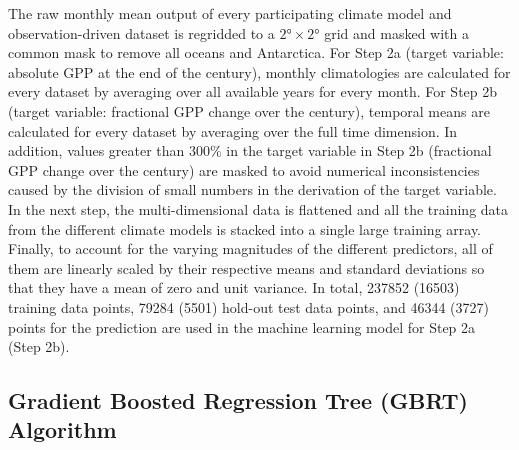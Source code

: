 The raw monthly mean output of every participating climate model and
observation-driven dataset is regridded to a $\ang{2} \times \ang{2}$ grid and
masked with a common mask to remove all oceans and Antarctica. For Step 2a
(target variable: absolute \acf{GPP} at the end of the  century),
monthly climatologies are calculated for every dataset by averaging over all
available years for every month. For Step 2b (target variable: fractional
\ac{GPP} change over the  century), temporal means are calculated for
every dataset by averaging over the full time dimension. In addition, values
greater than $300 \unit{\%}$ in the target variable in Step 2b (fractional
\ac{GPP} change over the  century) are masked to avoid numerical
inconsistencies caused by the division of small numbers in the derivation of
the target variable. In the next step, the multi-dimensional data is flattened
and all the training data from the different climate models is stacked into a
single large training array. Finally, to account for the varying magnitudes of
the different predictors, all of them are linearly scaled by their respective
means and standard deviations so that they have a mean of zero and unit
variance. In total, 237852 (16503) training data points, 79284 (5501) hold-out
test data points, and 46344 (3727) points for the prediction are used in the
machine learning model for Step 2a (Step 2b).


\subsection{Gradient Boosted Regression Tree (\acs{GBRT}) Algorithm}
\label{subsec:app:b:gbrt}

